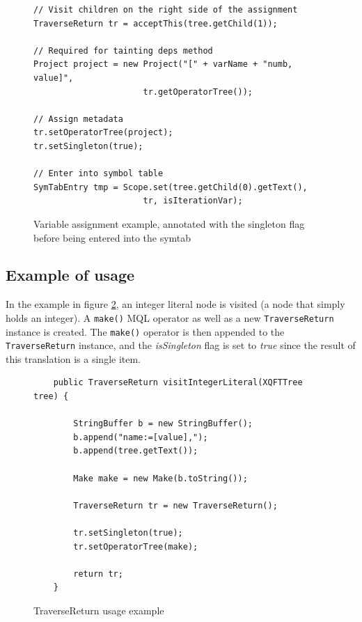\begin{figure}[!htp]
\begin{center}
\begin{Verbatim}
// Visit children on the right side of the assignment
TraverseReturn tr = acceptThis(tree.getChild(1));

// Required for tainting deps method
Project project = new Project("[" + varName + "numb, value]", 
                      tr.getOperatorTree());

// Assign metadata
tr.setOperatorTree(project);
tr.setSingleton(true);

// Enter into symbol table
SymTabEntry tmp = Scope.set(tree.getChild(0).getText(), 
                      tr, isIterationVar);
\end{Verbatim}
  \caption{Variable assignment example, annotated with the singleton flag
  before being entered into the symtab}
  \label{fig:impl:meta:var_assign_ex}
\end{center}
\end{figure}

\subsection{Example of usage}
In the example in figure \ref{fig:impl:meta:traverse_usage_ex}, an
integer literal node is visited (a node that simply holds an integer). A
\texttt{make()} MQL operator as well as a new \texttt{TraverseReturn}
instance is created. The \texttt{make()} operator is then appended to the 
\texttt{TraverseReturn} instance, and the \textit{isSingleton} flag is set to 
\textit{true} since the result of this translation is a single item.

\begin{figure}[!htp]
\begin{center}
\begin{Verbatim}
    public TraverseReturn visitIntegerLiteral(XQFTTree tree) {

        StringBuffer b = new StringBuffer();
        b.append("name:=[value],");
        b.append(tree.getText());
        
        Make make = new Make(b.toString());

        TraverseReturn tr = new TraverseReturn();
        
        tr.setSingleton(true);
        tr.setOperatorTree(make);

        return tr;
    }
\end{Verbatim}
  \caption{TraverseReturn usage example}
  \label{fig:impl:meta:traverse_usage_ex}
\end{center}
\end{figure}